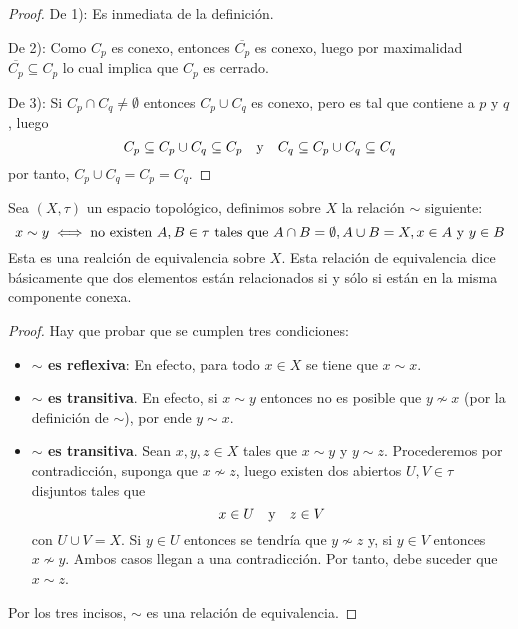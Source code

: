 \documentclass[12pt]{report}
\theoremstyle{largebreak}
\newcommand{\Cls}[1]{\ensuremath{\overline{#1}}}
\begin{document}
    \begin{proof}
        De 1): Es inmediata de la definición.

        De 2): Como $C_p$ es conexo, entonces $\Cls{C_p}$ es conexo, luego por maximalidad $\Cls{C_p}\subseteq C_p$ lo cual implica que $C_p$ es cerrado.

        De 3): Si $C_p\cap C_q\neq\emptyset$ entonces $C_p\cup C_q$ es conexo, pero es tal que contiene a $p$ y $q$, luego
        \begin{equation*}
            C_p\subseteq C_p\cup C_q\subseteq C_p\quad\textup{y}\quad C_q\subseteq C_p\cup C_q\subseteq C_q
        \end{equation*}
        por tanto, $C_p\cup C_q=C_p=C_q$.
    \end{proof}

    \begin{mydef}
        Sea $(X,\tau)$ un espacio topológico, definimos sobre $X$ la relación $\sim$ siguiente:
        \begin{equation*}
            x\sim y\iff\textup{no existen }A,B\in\tau\textup{ tales que }A\cap B=\emptyset, A\cup B=X, x\in A\textup{ y }y\in B
        \end{equation*}
        Esta es una realción de equivalencia sobre $X$. Esta relación de equivalencia dice básicamente que dos elementos están relacionados si y sólo si están en la misma componente conexa.
    \end{mydef}

    \begin{proof}
        Hay que probar que se cumplen tres condiciones:
        \begin{itemize}
            \item \textbf{$\sim$ es reflexiva}: En efecto, para todo $x\in X$ se tiene que $x\sim x$.
            \item \textbf{$\sim$ es transitiva}. En efecto, si $x\sim y$ entonces no es posible que $y\nsim x$ (por la definición de $\sim$), por ende $y\sim x$.
            \item \textbf{$\sim$ es transitiva}. Sean $x,y,z\in X$ tales que $x\sim y$ y $y\sim z$. Procederemos por contradicción, suponga que $x\nsim z$, luego existen dos abiertos $U,V\in\tau$ disjuntos tales que
            \begin{equation*}
                x\in U\quad\textup{y}\quad z\in V
            \end{equation*}
            con $U\cup V=X$. Si $y\in U$ entonces se tendría que $y\nsim z$ y, si $y\in V$ entonces $x\nsim y$. Ambos casos llegan a una contradicción. Por tanto, debe suceder que $x\sim z$.
        \end{itemize}
        Por los tres incisos, $\sim$ es una relación de equivalencia.
    \end{proof}
\end{document}
